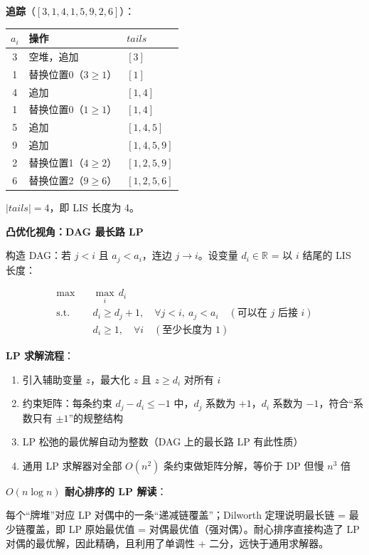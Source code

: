 \documentclass[12pt, a4paper]{ctexart}
\begin{document}
\begin{blackboard}
\textbf{追踪}（$[3,1,4,1,5,9,2,6]$）：

\medskip
\begin{tabular}{cll}
$a_i$ & 操作 & $\textit{tails}$ \\
\hline
3 & 空堆，追加 & $[3]$ \\
1 & 替换位置0（$3 \geq 1$） & $[1]$ \\
4 & 追加 & $[1,4]$ \\
1 & 替换位置0（$1 \geq 1$）& $[1,4]$ \\
5 & 追加 & $[1,4,5]$ \\
9 & 追加 & $[1,4,5,9]$ \\
2 & 替换位置1（$4 \geq 2$）& $[1,2,5,9]$ \\
6 & 替换位置2（$9 \geq 6$）& $[1,2,5,6]$ \\
\end{tabular}

\medskip
$|\textit{tails}|=4$，即 LIS 长度为 4。

\textbf{凸优化视角：DAG 最长路 LP}

构造 DAG：若 $j < i$ 且 $a_j < a_i$，连边 $j \to i$。设变量 $d_i \in \mathbb{R}$ = 以 $i$ 结尾的 LIS 长度：

\begin{align}
\max \quad & \max_i\, d_i \\
\text{s.t.} \quad & d_i \geq d_j + 1, \quad \forall j < i,\ a_j < a_i \quad (\text{可以在 $j$ 后接 $i$}) \\
& d_i \geq 1, \quad \forall i \quad (\text{至少长度为 1})
\end{align}

\textbf{LP 求解流程}：
\begin{enumerate}
    \item 引入辅助变量 $z$，最大化 $z$ 且 $z \geq d_i$ 对所有 $i$
    \item 约束矩阵：每条约束 $d_j - d_i \leq -1$ 中，$d_j$ 系数为 $+1$，$d_i$ 系数为 $-1$，符合``系数只有 $\pm 1$''的规整结构
    \item LP 松弛的最优解自动为整数（DAG 上的最长路 LP 有此性质）
    \item 通用 LP 求解器对全部 $O(n^2)$ 条约束做矩阵分解，等价于 DP 但慢 $n^3$ 倍
\end{enumerate}

\textbf{$O(n \log n)$ 耐心排序的 LP 解读}：

每个``牌堆''对应 LP 对偶中的一条``递减链覆盖''；Dilworth 定理说明最长链 = 最少链覆盖，即 LP 原始最优值 = 对偶最优值（强对偶）。耐心排序直接构造了 LP 对偶的最优解，因此精确，且利用了单调性 + 二分，远快于通用求解器。


\end{blackboard}
\end{document}
